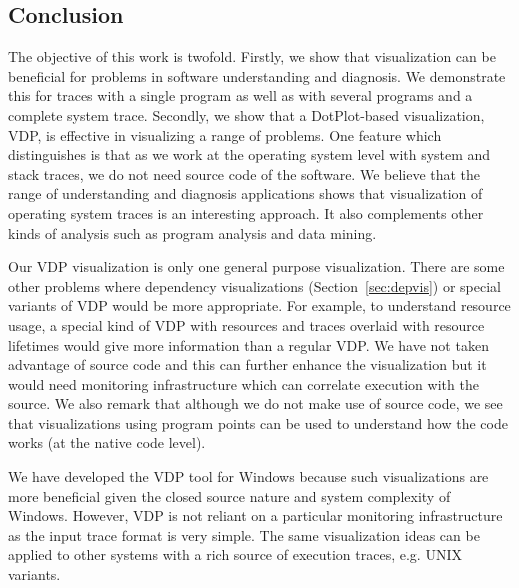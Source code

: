 \subsection{Conclusion}
\label{sec:lviz-conclusion}

The objective of this work is twofold.
Firstly, we show that visualization can be beneficial for problems
in software understanding and diagnosis. We demonstrate this
for traces with a single program as well as with
several programs and a complete system trace.
Secondly, we show that a DotPlot-based visualization, VDP, is effective
in visualizing a range of problems.
One feature which distinguishes  is that as we work
at the operating system level with system and stack traces,
we do not need source code of the software.
We believe that the range of understanding and diagnosis applications
shows that visualization of operating system traces is an interesting approach.
It also complements other kinds of analysis such
as program analysis and data mining.

Our VDP visualization is only one general purpose visualization.
There are some other problems where dependency visualizations
(Section~\ref{sec:depvis}) or special
variants of VDP would be more appropriate. For example, to understand
resource usage, a special kind of VDP with resources and traces overlaid
with resource lifetimes would give more information than a regular VDP.
We have not taken advantage of source code and this can further enhance
the visualization but it would need monitoring infrastructure which
can correlate execution with the source.
We also remark that although we do not make use of source code, we
see that visualizations using program points can be used to understand
how the code works (at the native code level).

We have developed the VDP tool for Windows because such visualizations
are more beneficial given the closed source nature and system complexity
of Windows.
However, VDP is not reliant on a particular monitoring infrastructure
as the input trace format is very simple.
The same visualization ideas can be applied
to other systems with a rich source of execution traces, e.g. UNIX variants.
